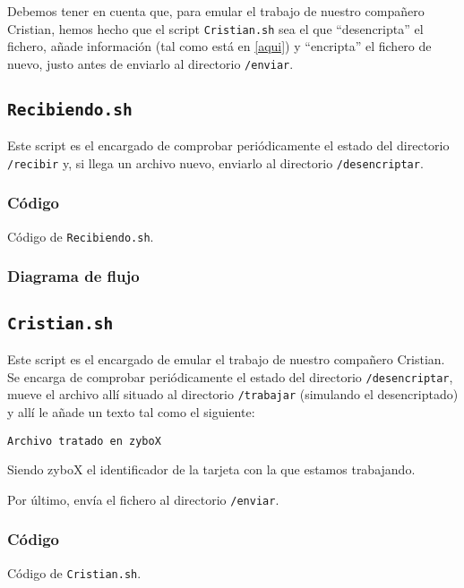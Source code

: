\documentclass[12pt,letterpaper]{article}
\begin{document}
Debemos tener en cuenta que, para emular el trabajo de nuestro compañero Cristian, hemos hecho que el script \texttt{Cristian.sh} sea el que ``desencripta'' el fichero, añade información (tal como está en \ref{aqui}) y ``encripta'' el fichero de nuevo, justo antes de enviarlo al directorio \texttt{/enviar}.

\subsection{\texttt{Recibiendo.sh}}
Este script es el encargado de comprobar periódicamente el estado del directorio \texttt{/recibir} y, si llega un archivo nuevo, enviarlo al directorio \texttt{/desencriptar}.

\subsubsection{Código}

\begin{center}
	Código de \texttt{Recibiendo.sh}.
\end{center}

\subsubsection{Diagrama de flujo}


\subsection{\texttt{Cristian.sh}}
Este script es el encargado de emular el trabajo de nuestro compañero Cristian. Se encarga de comprobar periódicamente el estado del directorio \texttt{/desencriptar}, mueve el archivo allí situado al directorio \texttt{/trabajar} (simulando el desencriptado) y allí le añade un texto tal como el siguiente:
\begin{center}
	\texttt{Archivo tratado en zyboX}
\end{center}

Siendo zyboX el identificador de la tarjeta con la que estamos trabajando.

Por último, envía el fichero al directorio \texttt{/enviar}.

\subsubsection{Código}

\begin{center}
	Código de \texttt{Cristian.sh}.
\end{center}
\end{document}
